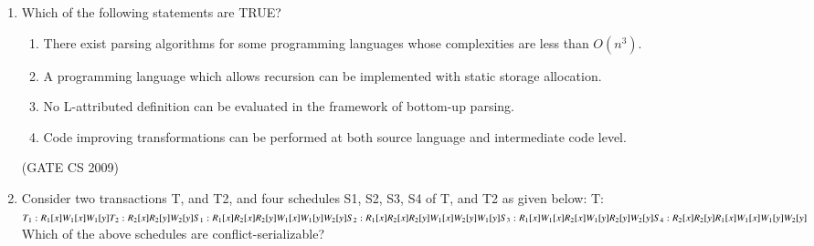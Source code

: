 \documentclass[a4paper, 11pt]{article}
\begin{document}
\begin{enumerate}
    \hfill (GATE CS 2009)
    
    \item Which of the following statements are TRUE?\\

    \begin{enumerate}[label=\Roman*]
        \item There exist parsing algorithms for some programming languages whose complexities are less than $O(n^3)$.
        \item A programming language which allows recursion can be implemented with static storage allocation.
        \item No L-attributed definition can be evaluated in the framework of bottom-up parsing.
        \item Code improving transformations can be performed at both source language and intermediate code level.
    \end{enumerate}
    \begin{enumerate}
    \end{enumerate}

    \hfill (GATE CS 2009)

    \item Consider two transactions T, and T2, and four schedules S1, S2, S3, S4 of T, and T2 as given below: T: \\
    $
    T_1: R_1[x] W_1[x] W_1[y]\\
    T_2: R_2[x] R_2[y] W_2[y]\\
    S_1: R_1[x] R_2[x] R_2[y] W_1[x] W_1[y] W_2[y] \\
    S_2: R_1[x] R_2[x] R_2[y] W_1[x] W_2[y] W_1[y]\\
    S_3: R_1[x] W_1[x] R_2[x] W_1[y] R_2[y] W_2[y]\\
    S_4: R_2[x] R_2[y] R_1[x] W_1[x] W_1[y] W_2[y]\\
    $
    Which of the above schedules are conflict-serializable?
    \begin{enumerate}
    \end{enumerate}


\end{enumerate}
\end{document}
